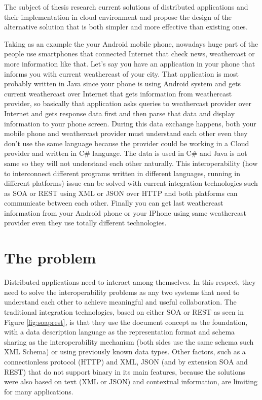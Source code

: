 The subject of thesis research current solutions of distributed applications and their implementation in cloud environment and propose the design of the alternative solution that is both simpler and more effective than existing ones.

Taking as an example the your Android mobile phone, nowadays huge part of the people use smartphones that connected Internet that check news, weathercast or more information like that. Let’s say you have an application in your phone that informs you with current weathercast of your city. That application is most probably written in Java since your phone is using Android system and gets current weathercast over Internet that gets information from weathercast provider, so basically that application asks queries to weathercast provider over Internet and gets response data first and then parse that data and display information to your phone screen. During this data exchange happens, both your mobile phone and weathercast provider must understand each other even they don’t use the same language because the provider could be working in a Cloud provider and written in C\# language.  The data is used in C\# and Java is not same so they will not understand each other naturally. This interoperability (how to interconnect different programs written in different languages, running in different platforms) issue can be solved with current integration technologies such as SOA or REST using XML or JSON over HTTP and both platforms can communicate between each other. Finally you can get last weathercast information from your Android phone or your IPhone using same weathercast provider even they use totally different technologies.

\section{The problem}
\label{section:problem}

Distributed applications need to interact among themselves. In this respect, they need to solve the interoperability problems as any two systems that need to understand each other to achieve meaningful and useful collaboration. The traditional integration technologies, based on either SOA or REST as seen in Figure \ref{fig:soaprest}, is that they use the document concept as the foundation, with a data description language as the representation format and schema sharing as the interoperability mechanism (both sides use the same schema such XML Schema) or using previously known data types. Other factors, such as a connectionless protocol (HTTP) and XML, JSON (and by extension SOA and REST) that do not support binary in its main features, because the solutions were also based on text (XML or JSON) and contextual information, are limiting for many applications.


